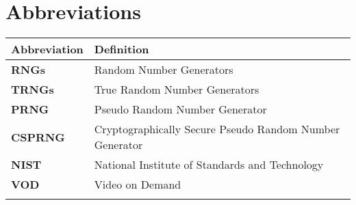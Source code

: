 \section{Abbreviations}
\begin{tabular}{ll}\toprule
\textbf{Abbreviation}& \textbf{Definition}\\\hline
\textbf{RNGs}& Random Number Generators\\
\textbf{TRNGs}& True Random Number Generators\\
\textbf{PRNG}& Pseudo Random Number Generator\\
\textbf{CSPRNG}& Cryptographically Secure Pseudo Random Number Generator\\
\textbf{NIST}& National Institute of Standards and Technology\\
\textbf{VOD}&Video on Demand\\\bottomrule
\textbf{}& \\
\end{tabular}
 

